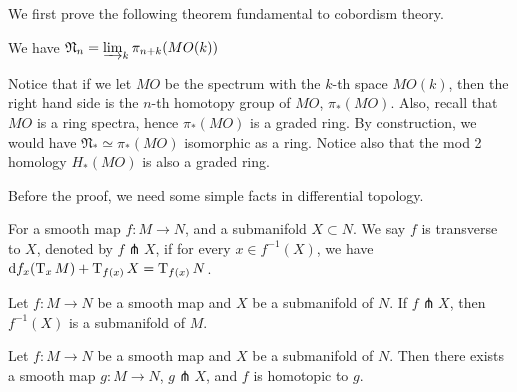 	We first prove the following theorem fundamental to cobordism theory. 
	\begin{thm}\label{MO_unoriented_cobordism}
		We have $\mathfrak{N}_n=\varinjlim_{k}\pi_{n+k}(MO(k))$
	\end{thm}
	\begin{remark}
		Notice that if we let $MO$ be the spectrum with the $k$-th space $MO(k)$, then the right hand side is the $n$-th homotopy group of $MO$, $\pi_*(MO)$. Also, recall that $MO$ is a ring spectra, hence $\pi_*(MO)$ is a graded ring. By construction, we would have $\mathfrak{N}_*\simeq\pi_*(MO)$ isomorphic as a ring. Notice also that the mod 2 homology $H_*(MO)$ is also a graded ring. 
	\end{remark}
	Before the proof, we need some simple facts in differential topology. 
	\begin{defn}
		For a smooth map $f:M\to N$, and a submanifold $X\subset N$. We say $f$ is transverse to $X$, denoted by $f\pitchfork X$, if for every $x\in f^{-1}(X)$, we have $\mathrm{d} f_x(\operatorname{\mathrm{T}}_xM)+\operatorname{\mathrm{T}}_{f(x)}X=\operatorname{\mathrm{T}}_{f(x)}N$. 
	\end{defn}
	\begin{thm}\label{transverse_pullback}
		Let $f:M\to N$ be a smooth map and $X$ be a submanifold of $N$. If $f\pitchfork X$, then $f^{-1}(X)$ is a submanifold of $M$. 
	\end{thm}
	\begin{thm}\label{generic_transversality}
		Let $f:M\to N$ be a smooth map and $X$ be a submanifold of $N$. Then there exists a smooth map $g:M\to N$, $g\pitchfork X$, and $f$ is homotopic to $g$. 
	\end{thm}
